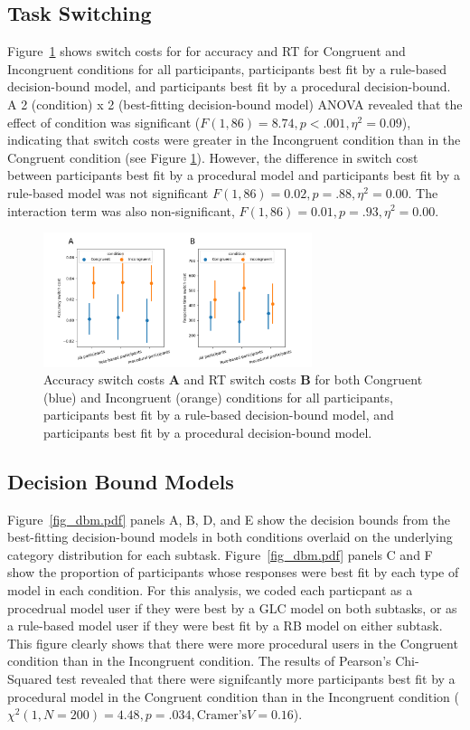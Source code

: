 \documentclass[doc, floatsintext]{apa7}
\begin{document}
\subsection{Task Switching}
Figure~\ref{fig_switch_cost} shows switch costs for for
accuracy and RT for Congruent and Incongruent conditions for
all participants, participants best fit by a rule-based
decision-bound model, and participants best fit by a
procedural decision-bound. A 2 (condition) x 2 (best-fitting
decision-bound model) ANOVA revealed that the effect of
condition was significant ($F(1, 86) = 8.74, p < .001,
\eta^2 = 0.09$), indicating that switch costs were greater
in the Incongruent condition than in the Congruent condition
(see Figure \ref{fig_switch_cost}). However, the difference
in switch cost between participants best fit by a procedural
model and participants best fit by a rule-based model was
not significant $F(1, 86) = 0.02, p = .88, \eta^2 = 0.00$.
The interaction term was also non-significant, $F(1, 86) =
0.01, p = .93, \eta^2 = 0.00$. 

\begin{figure}[h!]
    \centering
    \includegraphics[width=0.7\textwidth]{../figures/fig_switch_cost.png}
    \caption{
        Accuracy switch costs \textbf{A} and RT switch costs
        \textbf{B} for both Congruent (blue) and Incongruent
        (orange) conditions for all participants,
        participants best fit by a rule-based decision-bound
        model, and participants best fit by a procedural
        decision-bound model.
    }
    \label{fig_switch_cost}
\end{figure}

\subsection{Decision Bound Models}
Figure~\ref{fig_dbm.pdf} panels A, B, D, and E show the
decision bounds from the best-fitting decision-bound models
in both conditions overlaid on the underlying category
distribution for each subtask.  Figure~\ref{fig_dbm.pdf}
panels C and F show the proportion of participants whose
responses were best fit by each type of model in each
condition. For this analysis, we coded each particpant as a
procedrual model user if they were best by a GLC model on
both subtasks, or as a rule-based model user if they were
best fit by a RB model on either subtask. This figure
clearly shows that there were more procedural users in the
Congruent condition than in the Incongruent condition.  The
results of Pearson's Chi-Squared test revealed that there
were signifcantly more participants best fit by a procedural
model in the Congruent condition than in the Incongruent
condition ($\chi^2(1, N = 200) = 4.48, p = .034,
\text{Cramer’s} V = 0.16$).
\end{document}
